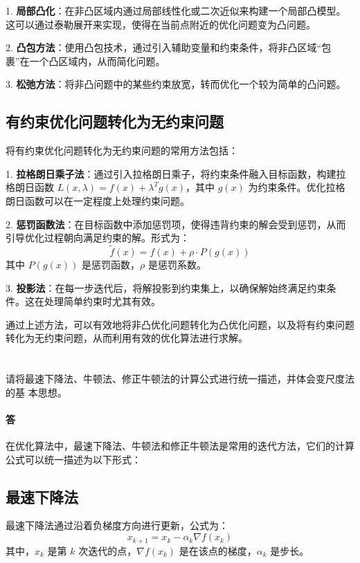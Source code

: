 \documentclass[a4paper]{article}
\begin{document}
1. \textbf{局部凸化}：在非凸区域内通过局部线性化或二次近似来构建一个局部凸模型。这可以通过泰勒展开来实现，使得在当前点附近的优化问题变为凸问题。

2. \textbf{凸包方法}：使用凸包技术，通过引入辅助变量和约束条件，将非凸区域“包裹”在一个凸区域内，从而简化问题。

3. \textbf{松弛方法}：将非凸问题中的某些约束放宽，转而优化一个较为简单的凸问题。

\subsection{有约束优化问题转化为无约束问题}

将有约束优化问题转化为无约束问题的常用方法包括：

1. \textbf{拉格朗日乘子法}：通过引入拉格朗日乘子，将约束条件融入目标函数，构建拉格朗日函数 $L(x, \lambda) = f(x) + \lambda^T g(x)$，其中 $g(x)$ 为约束条件。优化拉格朗日函数可以在一定程度上处理约束问题。

2. \textbf{惩罚函数法}：在目标函数中添加惩罚项，使得违背约束的解会受到惩罚，从而引导优化过程朝向满足约束的解。形式为：
   \[
   \tilde{f}(x) = f(x) + \rho \cdot P(g(x))
   \]
   其中 $P(g(x))$ 是惩罚函数，$\rho$ 是惩罚系数。

3. \textbf{投影法}：在每一步迭代后，将解投影到约束集上，以确保解始终满足约束条件。这在处理简单约束时尤其有效。

通过上述方法，可以有效地将非凸优化问题转化为凸优化问题，以及将有约束问题转化为无约束问题，从而利用有效的优化算法进行求解。

\section{}

请将最速下降法、牛顿法、修正牛顿法的计算公式进行统一描述，并体会变尺度法的基
本思想。 

\paragraph{答}

在优化算法中，最速下降法、牛顿法和修正牛顿法是常用的迭代方法，它们的计算公式可以统一描述为以下形式：

\subsection{最速下降法}

最速下降法通过沿着负梯度方向进行更新，公式为：
\[
x_{k+1} = x_k - \alpha_k \nabla f(x_k)
\]
其中，$x_k$ 是第 $k$ 次迭代的点，$\nabla f(x_k)$ 是在该点的梯度，$\alpha_k$ 是步长。
\end{document}
